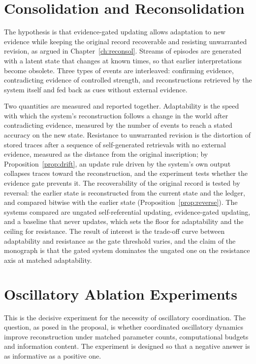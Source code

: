 \chapter{Consolidation and Reconsolidation}\label{ch:reconsol-exp}

The hypothesis is that evidence-gated updating allows adaptation to new evidence while keeping the original record recoverable and resisting unwarranted revision, as argued in Chapter~\ref{ch:reconsol}. Streams of episodes are generated with a latent state that changes at known times, so that earlier interpretations become obsolete. Three types of events are interleaved: confirming evidence, contradicting evidence of controlled strength, and reconstructions retrieved by the system itself and fed back as cues without external evidence.

Two quantities are measured and reported together. Adaptability is the speed with which the system's reconstruction follows a change in the world after contradicting evidence, measured by the number of events to reach a stated accuracy on the new state. Resistance to unwarranted revision is the distortion of stored traces after a sequence of self-generated retrievals with no external evidence, measured as the distance from the original inscription; by Proposition~\ref{prop:drift}, an update rule driven by the system's own output collapses traces toward the reconstruction, and the experiment tests whether the evidence gate prevents it. The recoverability of the original record is tested by reversal: the earlier state is reconstructed from the current state and the ledger, and compared bitwise with the earlier state (Proposition~\ref{prop:reverse}). The systems compared are ungated self-referential updating, evidence-gated updating, and a baseline that never updates, which sets the floor for adaptability and the ceiling for resistance. The result of interest is the trade-off curve between adaptability and resistance as the gate threshold varies, and the claim of the monograph is that the gated system dominates the ungated one on the resistance axis at matched adaptability.

\chapter{Oscillatory Ablation Experiments}\label{ch:ablation}

This is the decisive experiment for the necessity of oscillatory coordination. The question, as posed in the proposal, is whether coordinated oscillatory dynamics improve reconstruction under matched parameter counts, computational budgets and information content. The experiment is designed so that a negative answer is as informative as a positive one.

